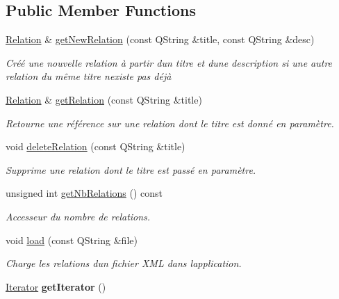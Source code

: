 \subsection*{Public Member Functions}
\begin{DoxyCompactItemize}
\item 
\hyperlink{class_relation}{Relation} \& \hyperlink{class_relation_manager_a1f9d556e0505105205e1fdb4905c4a80}{get\+New\+Relation} (const Q\+String \&title, const Q\+String \&desc)
\begin{DoxyCompactList}\small\item\em Créé une nouvelle relation à partir d\textquotesingle{}un titre et d\textquotesingle{}une description si une autre relation du même titre n\textquotesingle{}existe pas déjà \end{DoxyCompactList}\item 
\hyperlink{class_relation}{Relation} \& \hyperlink{class_relation_manager_ad9ffbaba761149560d915f081d379ecc}{get\+Relation} (const Q\+String \&title)
\begin{DoxyCompactList}\small\item\em Retourne une référence sur une relation dont le titre est donné en paramètre. \end{DoxyCompactList}\item 
void \hyperlink{class_relation_manager_a074413b3ed72a1342821e911c1fa3587}{delete\+Relation} (const Q\+String \&title)
\begin{DoxyCompactList}\small\item\em Supprime une relation dont le titre est passé en paramètre. \end{DoxyCompactList}\item 
\mbox{\label{class_relation_manager_abbd0627b6e986fcc5af94e3c71e0b148}} 
unsigned int \hyperlink{class_relation_manager_abbd0627b6e986fcc5af94e3c71e0b148}{get\+Nb\+Relations} () const
\begin{DoxyCompactList}\small\item\em Accesseur du nombre de relations. \end{DoxyCompactList}\item 
void \hyperlink{class_relation_manager_a37273bc4c1d223bf99ff10ba7feba50a}{load} (const Q\+String \&file)
\begin{DoxyCompactList}\small\item\em Charge les relations d\textquotesingle{}un fichier X\+ML dans l\textquotesingle{}application. \end{DoxyCompactList}\item 
\mbox{\label{class_relation_manager_aefe037f480e43c5c7e786cb13b3f1084}} 
\hyperlink{class_relation_manager_1_1_iterator}{Iterator} {\bfseries get\+Iterator} ()
\end{DoxyCompactItemize}
